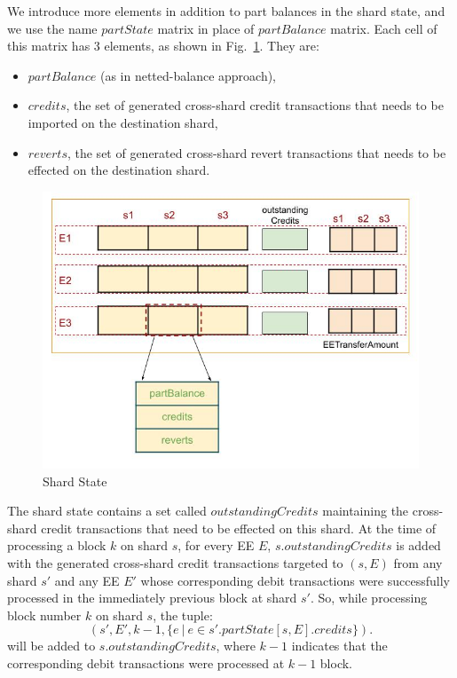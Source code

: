 \documentclass{IEEEtran}
\begin{document}
We introduce more elements in addition to part balances in the shard state, and we use the name $partState$ matrix in place of $partBalance$ matrix. Each cell of this matrix has 3 elements, as shown in Fig.~\ref{fig:shardstate}. They are:
\begin{itemize}
	\item $partBalance$ (as in netted-balance approach),
	\item $credits$, the set of generated cross-shard credit transactions that needs to be imported on the destination shard,
	\item $reverts$, the set of generated cross-shard revert transactions that needs to be effected on the destination shard.
\end{itemize}

\begin{figure}[h]
	\centering
	\includegraphics[scale=0.4]{state.jpg}
	\caption{Shard State\label{fig:shardstate}}
\end{figure}
	
The shard state contains a set called $outstandingCredits$ maintaining the cross-shard credit transactions that need to be effected on this shard. At the time of processing a block $k$ on shard $s$, for every EE $E$, $s.outstandingCredits$ is added with the generated cross-shard credit transactions targeted to $(s,E)$ from any shard $s'$ and any EE $E'$ whose corresponding debit transactions were successfully processed in the immediately previous block at shard $s'$. So, while processing block number $k$ on shard $s$, the tuple:
\[
	(s', E', k-1, \{e ~|~ e \in s'.partState[s,E].credits\}).
\]
will be added to $s.outstandingCredits$, where $k-1$ indicates that the corresponding debit transactions were processed at $k-1$ block. 
\end{document}
